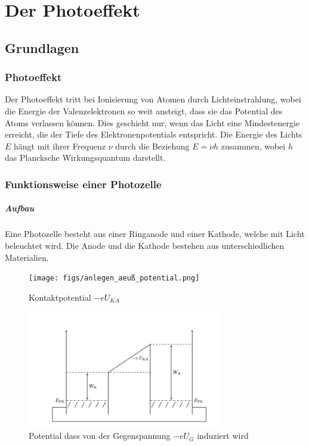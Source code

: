 \chapter{Der Photoeffekt}
\section{Grundlagen}
\subsection{Photoeffekt}
Der Photoeffekt tritt bei Ionisierung von Atomen durch Lichteinstrahlung, wobei die Energie der Valenzelektronen so weit ansteigt, dass sie das Potential des Atoms verlassen können. Dies geschieht nur, wenn das Licht eine Mindestenergie erreicht, die der Tiefe des Elektronenpotentials entspricht. Die Energie des Lichts \(E\) hängt mit ihrer Frequenz \(\nu\) durch die Beziehung \(E = \nu h\) zusammen, wobei \(h\) das Plancksche Wirkungsquantum darstellt. 
\subsection{Funktionsweise einer Photozelle}
\paragraph{Aufbau}
Eine Photozelle besteht aus einer Ringanode und einer Kathode, welche mit Licht beleuchtet
wird. Die Anode und die Kathode bestehen aus unterschiedlichen Materialien.


\begin{figure}[htbp]
    \centering
    \texttt{[image: figs/anlegen\_aeuß\_potential.png]}
    \caption{ Kontaktpotential $-eU_{KA}$ \cite{praktikum}}
    \label{fig:potential ext}
\end{figure}
\FloatBarrier

\begin{figure}[htbp]
    \centering
    \includegraphics[width=0.75\textwidth]{figs/kontaktpotential_kurzgeschl_elektroden.png}
    \caption{  Potential dass von der Gegenspannung
$-eU_G$ induziert wird\cite{praktikum}}
    \label{fig:potential kurzg.}
\end{figure}
\FloatBarrier


